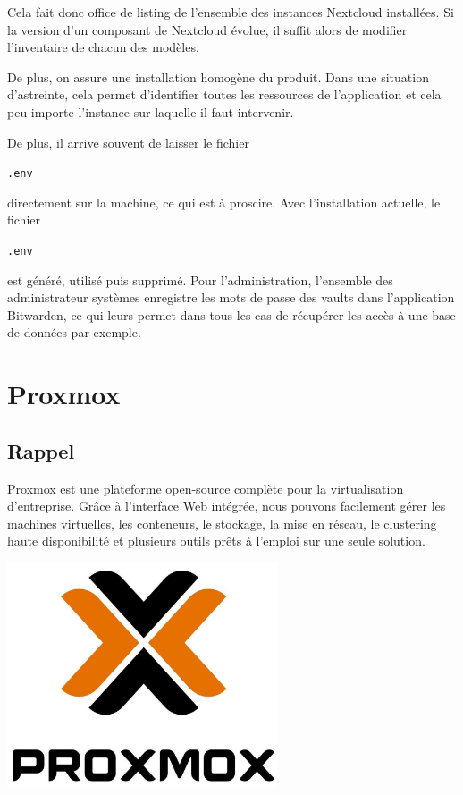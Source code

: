 \documentclass[12pt, a4paper, twoside]{article}
\begin{document}
Cela fait donc office de listing de l'ensemble des instances \gls{Nextcloud} installées. 
Si la version d'un composant de \gls{Nextcloud} évolue, il suffit alors de modifier l'inventaire de chacun des modèles.

De plus, on assure une installation homogène du produit. 
Dans une situation d'astreinte, cela permet d'identifier toutes les ressources de l'application et cela peu importe l'instance sur laquelle il faut intervenir.

De plus, il arrive souvent de laisser le fichier \begin{code}\texttt{.env}\end{code} directement sur la machine, ce qui est à proscire. 
Avec l'installation actuelle, le fichier \begin{code}\texttt{.env}\end{code} est généré, utilisé puis supprimé. 
Pour l'administration, l'ensemble des administrateur systèmes enregistre les mots de passe des vaults dans l'application Bitwarden, ce qui leurs permet dans tous les cas de récupérer les accès à une base de données par exemple.

\newpage
\section{Proxmox}
\subsection{Rappel}
\noindent%
\begin{minipage}{.7\textwidth}%
\gls{Proxmox} est une plateforme open-source complète pour la virtualisation d'entreprise. 
Grâce à l'interface Web intégrée, nous pouvons facilement gérer les machines virtuelles, les conteneurs, le stockage, la mise en réseau, le clustering haute disponibilité et plusieurs outils prêts à l'emploi sur une seule solution.
\end{minipage}%
\hfill
\begin{minipage}{.3\textwidth}%
\begin{center}
\includegraphics[width=0.6\textwidth]{src/logo_proxmox.jpg}
\end{center}
\end{minipage}%
\end{document}

